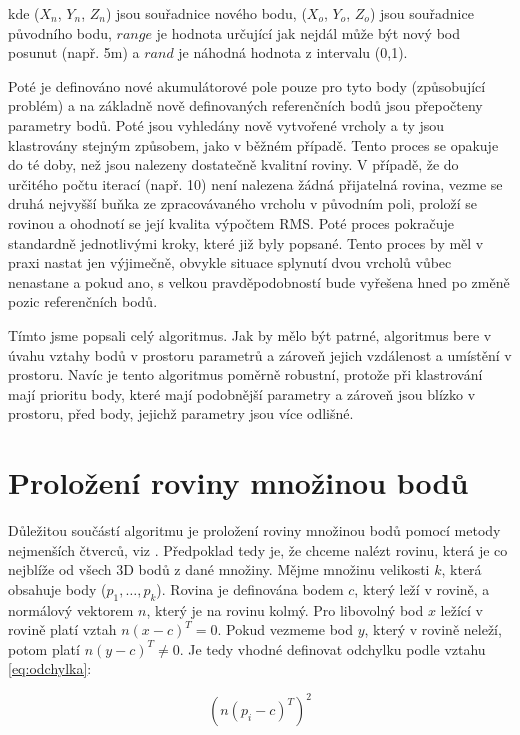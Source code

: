 \documentclass[11pt,twoside,a4paper]{book}
\begin{document}
\noindent
kde ($X_n$, $Y_n$, $Z_n$) jsou souřadnice nového bodu, ($X_o$, $Y_o$, $Z_o$) jsou souřadnice původního bodu, $range$ je hodnota určující jak nejdál může být nový bod posunut (např. 5m) a $rand$ je náhodná hodnota z intervalu (0,1).

Poté je definováno nové akumulátorové pole pouze pro tyto body (způsobující problém) a na základně nově definovaných referenčních bodů jsou přepočteny parametry bodů. Poté jsou vyhledány nově vytvořené vrcholy a ty jsou klastrovány stejným způsobem, jako v běžném případě. Tento proces se opakuje do té doby, než jsou nalezeny dostatečně kvalitní roviny. V případě, že do určitého počtu iterací (např. 10) není nalezena žádná přijatelná rovina, vezme se druhá nejvyšší buňka ze zpracovávaného vrcholu v původním poli, proloží se rovinou a ohodnotí se její kvalita výpočtem RMS. Poté proces pokračuje standardně jednotlivými kroky, které již byly popsané. Tento proces by měl v praxi nastat jen výjimečně, obvykle situace splynutí dvou vrcholů vůbec nenastane a pokud ano, s velkou pravděpodobností bude vyřešena hned po změně pozic referenčních bodů.

Tímto jsme popsali celý algoritmus. Jak by mělo být patrné, algoritmus bere v úvahu vztahy bodů v prostoru parametrů a zároveň jejich vzdálenost a umístění v prostoru. Navíc je tento algoritmus poměrně robustní, protože při klastrování mají prioritu body, které mají podobnější parametry a zároveň jsou blízko v prostoru, před body, jejichž parametry jsou více odlišné.


\section{Proložení roviny množinou bodů}
\label{sub:lsq}
Důležitou součástí algoritmu je proložení roviny množinou bodů pomocí metody nej\-men\-ších čtverců, viz \cite{wiki:leastsq}. Předpoklad tedy je, že chceme nalézt rovinu, která je co nejblíže od všech 3D bodů z dané množiny. Mějme množinu velikosti $k$, která obsahuje body ($p_1, \ldots, p_k$). Rovina je definována bodem $c$, který leží v rovině, a normálový vektorem $n$, který je na rovinu kolmý. Pro libovolný bod $x$ ležící v rovině platí vztah $n(x - c)^T = 0$. Pokud vezmeme bod $y$, který v rovině neleží, potom platí $n(y - c)^T \neq 0$. Je tedy vhodné definovat odchylku podle vztahu \ref{eq:odchylka}:

\begin{equation}
\label{eq:odchylka}
(n (p_i - c)^T)^2
\end{equation}
\end{document}
